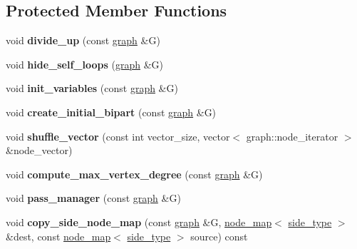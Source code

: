 \subsection*{Protected Member Functions}
\begin{DoxyCompactItemize}
\item 
\mbox{\label{classfm__partition_ad768579b813500dc2d267aac5668ed48}} 
void {\bfseries divide\+\_\+up} (const \mbox{\hyperlink{classgraph}{graph}} \&G)
\item 
\mbox{\label{classfm__partition_a3e3aa22119ff5ff9c406683e22ab6078}} 
void {\bfseries hide\+\_\+self\+\_\+loops} (\mbox{\hyperlink{classgraph}{graph}} \&G)
\item 
\mbox{\label{classfm__partition_aad791ac648a9ff4694c8960f49dcc018}} 
void {\bfseries init\+\_\+variables} (const \mbox{\hyperlink{classgraph}{graph}} \&G)
\item 
\mbox{\label{classfm__partition_a25ef3fc22bee176abfef64248484e8c0}} 
void {\bfseries create\+\_\+initial\+\_\+bipart} (const \mbox{\hyperlink{classgraph}{graph}} \&G)
\item 
\mbox{\label{classfm__partition_a2118f4ef46c76ed9863ee8c9cd557a09}} 
void {\bfseries shuffle\+\_\+vector} (const int vector\+\_\+size, vector$<$ graph\+::node\+\_\+iterator $>$ \&node\+\_\+vector)
\item 
\mbox{\label{classfm__partition_a5d0f409b6b1d554a62d67952236c7ce9}} 
void {\bfseries compute\+\_\+max\+\_\+vertex\+\_\+degree} (const \mbox{\hyperlink{classgraph}{graph}} \&G)
\item 
\mbox{\label{classfm__partition_aec7b2a315bc003fbd98debd5cd879f99}} 
void {\bfseries pass\+\_\+manager} (const \mbox{\hyperlink{classgraph}{graph}} \&G)
\item 
\mbox{\label{classfm__partition_a33d1dbba0ce9e398adab753f403deac3}} 
void {\bfseries copy\+\_\+side\+\_\+node\+\_\+map} (const \mbox{\hyperlink{classgraph}{graph}} \&G, \mbox{\hyperlink{classnode__map}{node\+\_\+map}}$<$ \mbox{\hyperlink{classfm__partition_a7cdff1bea3740a287387e8408e16ca79}{side\+\_\+type}} $>$ \&dest, const \mbox{\hyperlink{classnode__map}{node\+\_\+map}}$<$ \mbox{\hyperlink{classfm__partition_a7cdff1bea3740a287387e8408e16ca79}{side\+\_\+type}} $>$ source) const

\end{DoxyCompactItemize}
